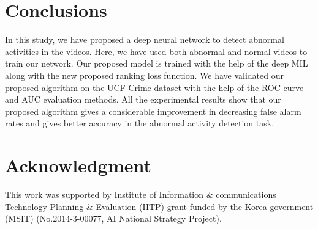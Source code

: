 \documentclass[conference]{IEEEtran}
\begin{document}
\section{Conclusions} \label{con}
In this study, we have proposed a deep neural network to detect abnormal activities in the videos. Here, we have used both abnormal and normal videos to train our network. Our proposed model is trained with the help of the deep MIL along with the new proposed ranking loss function. We have validated our proposed algorithm on the UCF-Crime dataset with the help of the ROC-curve and AUC evaluation methods. 
All the experimental results show that our proposed algorithm gives a considerable improvement in decreasing false alarm rates and gives better accuracy in the abnormal activity detection task.
\section*{Acknowledgment}
This work was supported by Institute of Information \& communications Technology Planning \& Evaluation (IITP) grant funded by the Korea government (MSIT) (No.2014-3-00077, AI National Strategy Project).















































\end{document}
